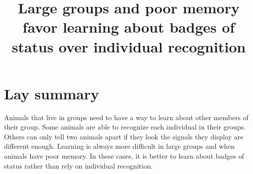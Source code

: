 




\noindent
\title{Large groups and poor memory favor learning about badges of status over individual recognition} 
\author{}
\date{} 
\maketitle


\linenumbers

\section*{Lay summary}
Animals that live in groups need to have a way to learn about other members of their group. Some animals are able to recognize each individual in their groups. Others can only tell two animals apart if they look the signals they display are different enough. Learning is always more difficult in large groups and when animals have poor memory. In these cases, it is better to learn about badges of status rather than rely on individual recognition.

